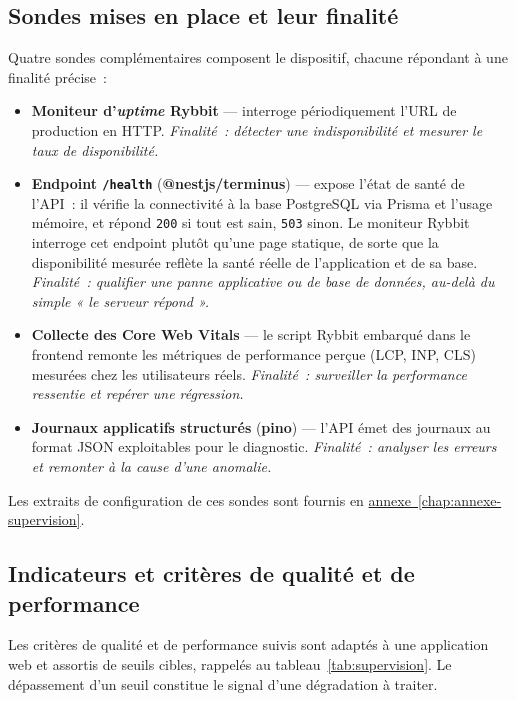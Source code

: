 \subsection{Sondes mises en place et leur finalité}
Quatre sondes complémentaires composent le dispositif, chacune répondant à une finalité précise~:
\begin{itemize}
    \item \textbf{Moniteur d'\emph{uptime} Rybbit} — interroge périodiquement l'URL de production en HTTP. \emph{Finalité~: détecter une indisponibilité et mesurer le taux de disponibilité.}
    \item \textbf{Endpoint \texttt{/health}} (\textbf{@nestjs/terminus}) — expose l'état de santé de l'API~: il vérifie la connectivité à la base PostgreSQL via Prisma et l'usage mémoire, et répond \texttt{200} si tout est sain, \texttt{503} sinon. Le moniteur Rybbit interroge cet endpoint plutôt qu'une page statique, de sorte que la disponibilité mesurée reflète la santé réelle de l'application et de sa base. \emph{Finalité~: qualifier une panne applicative ou de base de données, au-delà du simple « le serveur répond ».}
    \item \textbf{Collecte des Core Web Vitals} — le script Rybbit embarqué dans le frontend remonte les métriques de performance perçue (LCP, INP, CLS) mesurées chez les utilisateurs réels. \emph{Finalité~: surveiller la performance ressentie et repérer une régression.}
    \item \textbf{Journaux applicatifs structurés} (\textbf{pino}) — l'API émet des journaux au format JSON exploitables pour le diagnostic. \emph{Finalité~: analyser les erreurs et remonter à la cause d'une anomalie.}
\end{itemize}
Les extraits de configuration de ces sondes sont fournis en \hyperref[chap:annexe-supervision]{annexe~\ref*{chap:annexe-supervision}}.

\subsection{Indicateurs et critères de qualité et de performance}
Les critères de qualité et de performance suivis sont adaptés à une application web et assortis de seuils cibles, rappelés au tableau~\ref{tab:supervision}. Le dépassement d'un seuil constitue le signal d'une dégradation à traiter.

